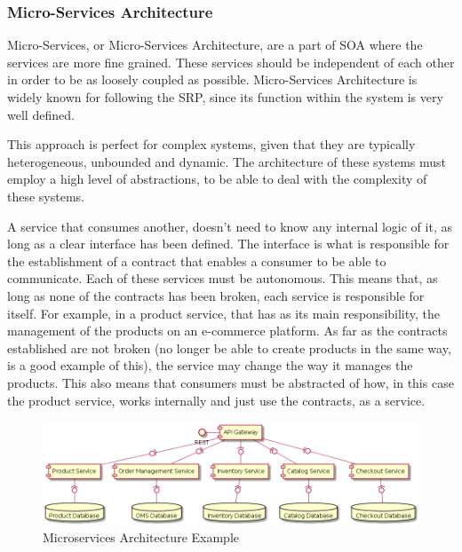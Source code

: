 \subsubsection{Micro-Services Architecture}
\label{sub:StateOfTheArt_Architectures_microservices}
Micro-Services, or Micro-Services Architecture, are a part of \gls{SOA} where the services are more fine grained. These services should be independent of each other in order to be as loosely coupled as possible. Micro-Services Architecture is widely known for following the \gls{SRP}, since its function within the system is very well defined.
\par
This approach is perfect for complex systems, given that they are typically heterogeneous, unbounded and dynamic. The architecture of these systems must employ a high level of abstractions, to be able to deal with the complexity of these systems. 
\par
A service that consumes another, doesn't need to know any internal logic of it, as long as a clear interface has been defined. The interface is what is responsible for the establishment of a contract that enables a consumer to be able to communicate. Each of these services must be autonomous. This means that, as long as none of the contracts has been broken, each service is responsible for itself. For example, in a product service, that has as its main responsibility, the management of the products on an e-commerce platform. As far as the contracts established are not broken (no longer be able to create products in the same way, is a good example of this), the service may change the way it manages the products. This also means that consumers must be abstracted of how, in this case the product service, works internally and just use the contracts, as a service.
\par

\begin{figure}[ht]
\centering
\includegraphics[width=\textwidth,keepaspectratio]{chapters/State_of_the_Art/assets/SOA_example.png}
\caption[Microservices Architecture Example]{Microservices Architecture Example}
\label{fig:microservicesExample}
\end{figure}

